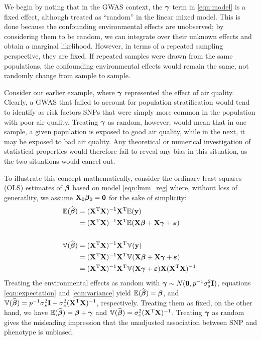 We begin by noting that in the GWAS context, the $\boldsymbol{\gamma}$ term in \eqref{eqn:model} is a fixed effect, although treated as ``random'' in the linear mixed model.  This is done because the confounding environmental effects are unobserved; by considering them to be random, we can integrate over their unknown effects and obtain a marginal likelihood.  However, in terms of a repeated sampling perspective, they are fixed.  If repeated samples were drawn from the same populations, the confounding environmental effects would remain the same, not randomly change from sample to sample.  

Consider our earlier example, where $\boldsymbol{\gamma}$ represented the effect of air quality.  Clearly, a GWAS that failed to account for population stratification would tend to identify as risk factors SNPs that were simply more common in the population with poor air quality.  Treating $\boldsymbol{\gamma}$ as random, however, would mean that in one sample, a given population is exposed to good air quality, while in the next, it may be exposed to bad air quality.  Any theoretical or numerical investigation of statistical properties would therefore fail to reveal any bias in this situation, as the two situations would cancel out.

To illustrate this concept mathematically, consider the ordinary least squares (OLS) estimates of $\boldsymbol{\beta}{}$ based on model \eqref{eqn:lmm_reg} where, without loss of generatlity, we assume $\mathbf{X}_0 \boldsymbol{\beta}{}_0 = \boldsymbol{0}$ for the sake of simplicity: 
\begin{align}
    \mathbb{E}(\widehat{\boldsymbol{\beta}{}}) &= (\mathbf{X}^{\text{T}} \mathbf{X})^{-1} \mathbf{X}^{\text{T}} \mathbb{E}(\mathbf{y}) \notag \\
    &=  (\mathbf{X}^{\text{T}} \mathbf{X})^{-1} \mathbf{X}^{\text{T}} \mathbb{E}(\mathbf{X}\boldsymbol{\beta}{} + \mathbf{X}\boldsymbol{\gamma} + \boldsymbol{\varepsilon}{}) \label{eqn:expectation}\\
    &\quad \notag\\
    \mathbb{V}(\widehat{\boldsymbol{\beta}{}}) &= (\mathbf{X}^{\text{T}} \mathbf{X})^{-1} \mathbf{X}^{\text{T}} \mathbb{V}(\mathbf{y}) \notag\\
    &=  (\mathbf{X}^{\text{T}} \mathbf{X})^{-1} \mathbf{X}^{\text{T}} \mathbb{V}(\mathbf{X}\boldsymbol{\beta}{} + \mathbf{X}\boldsymbol{\gamma} + \boldsymbol{\varepsilon}{}) \notag\\
    &=  (\mathbf{X}^{\text{T}} \mathbf{X})^{-1} \mathbf{X}^{\text{T}} \mathbb{V}(\mathbf{X}\boldsymbol{\gamma} + \boldsymbol{\varepsilon}{}) \mathbf{X}  (\mathbf{X}^{\text{T}} \mathbf{X})^{-1} \label{eqn:variance}.
\end{align}
Treating the environmental effects as random with $\boldsymbol{\gamma} \sim N(\boldsymbol{0}, p^{-1} \sigma^2_s \mathbf{I})$, equations \eqref{eqn:expectation} and \eqref{eqn:variance} yield $\mathbb{E}(\widehat{\boldsymbol{\beta}{}}) = \boldsymbol{\beta}{}$, and $\mathbb{V}(\widehat{\boldsymbol{\beta}{}}) = p^{-1}\sigma^2_s\mathbf{I} + \sigma^2_e (\mathbf{X}^{\text{T}} \mathbf{X})^{-1}$, respectively. Treating them as fixed, on the other hand, we have $\mathbb{E}(\widehat{\boldsymbol{\beta}{}}) = \boldsymbol{\beta}{} + \boldsymbol{\gamma}$ and $\mathbb{V}(\widehat{\boldsymbol{\beta}{}}) = \sigma^2_e (\mathbf{X}^{\text{T}} \mathbf{X})^{-1}$. Treating $\boldsymbol{\gamma}$ as random gives the misleading impression that the unadjusted association between SNP and phenotype is unbiased.


